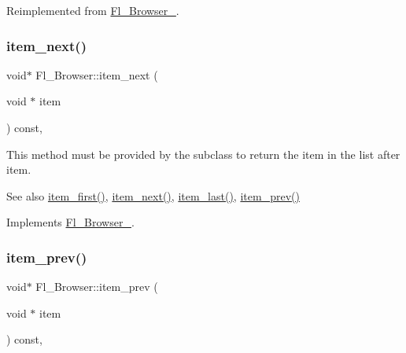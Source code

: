 Reimplemented from \hyperlink{class_fl___browser___a2302bec54f4ea593146be5490a7fe93b}{Fl\+\_\+\+Browser\+\_\+}.

\mbox{\label{class_fl___browser_aca0d9393c07552ce4ee75a9a10dbe93e}} 
\subsubsection{\texorpdfstring{item\+\_\+next()}{item\_next()}}
{\footnotesize\ttfamily void$\ast$ Fl\+\_\+\+Browser\+::item\+\_\+next (\begin{DoxyParamCaption}\item[{void $\ast$}]{item }\end{DoxyParamCaption}) const\hspace{0.3cm}{\ttfamily [protected]}, {\ttfamily [virtual]}}

This method must be provided by the subclass to return the item in the list after {\ttfamily item}. \begin{DoxySeeAlso}{See also}
\hyperlink{class_fl___browser_a7822c6d04744af8f9ffa7a1e0c46955c}{item\+\_\+first()}, \hyperlink{class_fl___browser_aca0d9393c07552ce4ee75a9a10dbe93e}{item\+\_\+next()}, \hyperlink{class_fl___browser_a5de7360f3e39ad20c3bf552893a92626}{item\+\_\+last()}, \hyperlink{class_fl___browser_a0fbf4d057bc1b7afcdd872b78ee8526b}{item\+\_\+prev()} 
\end{DoxySeeAlso}


Implements \hyperlink{class_fl___browser___aca6035552f5e9ecbeaa6caaf5fb8a3cb}{Fl\+\_\+\+Browser\+\_\+}.

\mbox{\label{class_fl___browser_a0fbf4d057bc1b7afcdd872b78ee8526b}} 
\subsubsection{\texorpdfstring{item\+\_\+prev()}{item\_prev()}}
{\footnotesize\ttfamily void$\ast$ Fl\+\_\+\+Browser\+::item\+\_\+prev (\begin{DoxyParamCaption}\item[{void $\ast$}]{item }\end{DoxyParamCaption}) const\hspace{0.3cm}{\ttfamily [protected]}, {\ttfamily [virtual]}}

